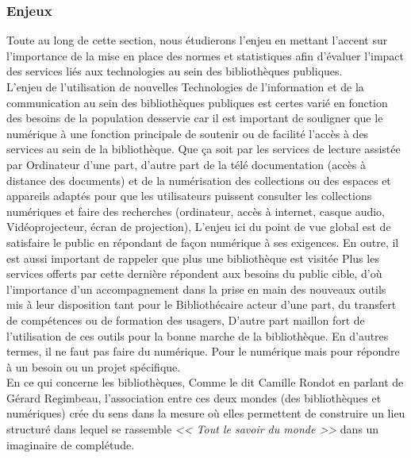 \documentclass[french,a4paper,12pt]{article}
\begin{document}
\subsubsection{Enjeux} 

\quad Toute au long de cette section, nous étudierons l’enjeu en mettant l’accent sur l’importance de la mise en place des normes et statistiques afin d'évaluer l’impact des services liés aux technologies au sein des bibliothèques publiques.\\
 
 \quad L’enjeu de l'utilisation de nouvelles Technologies de l'information et de la communication au sein des bibliothèques publiques est certes varié en fonction des besoins de la population desservie car il est important de souligner que le numérique à une fonction principale de soutenir ou de facilité l'accès à des services au sein de la bibliothèque. Que ça soit par les services de lecture assistée par Ordinateur d'une part, d’autre part de la télé documentation (accès à distance des documents) et de la numérisation des collections ou des espaces et appareils adaptés pour que les utilisateurs puissent consulter les collections numériques et faire des recherches (ordinateur, accès à internet, casque audio, Vidéoprojecteur, écran de projection), L'enjeu ici du point de vue global est de satisfaire le public en répondant de façon numérique à ses exigences. En outre, il est aussi important de rappeler que plus une bibliothèque est visitée Plus les services offerts par cette dernière répondent aux besoins du public cible, d'où l'importance d'un accompagnement dans la prise en main des nouveaux outils mis à leur disposition tant pour le Bibliothécaire acteur d'une part, du transfert de compétences ou de formation des usagers, D'autre part maillon fort de l'utilisation de ces outils pour la bonne marche de la bibliothèque. En d’autres termes, il ne faut pas faire du numérique. Pour le numérique mais pour répondre à un besoin ou un projet spécifique.\\
En ce qui concerne les bibliothèques, Comme le dit Camille Rondot en parlant de Gérard Regimbeau, l'association entre ces deux mondes (des bibliothèques et numériques) crée du sens dans la mesure où elles permettent de construire un lieu structuré dans lequel se rassemble \textit{<< Tout le savoir du monde >> }dans un imaginaire de complétude\citep{rondot_bibliotheques_2022}.
\end{document}
